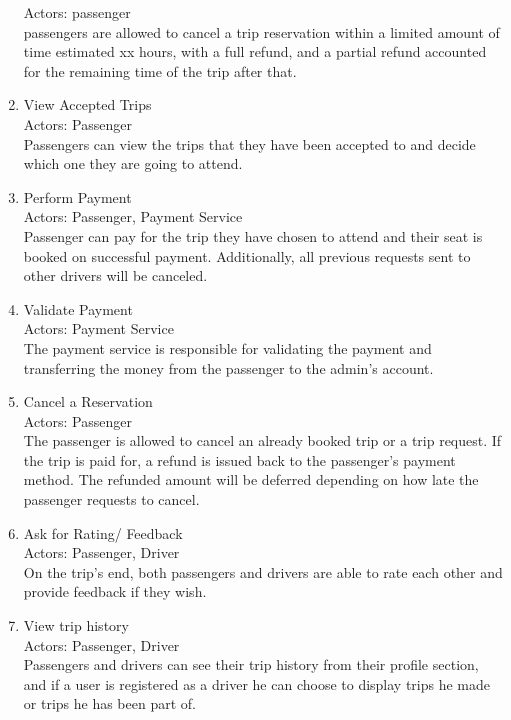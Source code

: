 \documentclass[a4paper, 12pt]{report} %
\begin{document}
\begin{enumerate}
                    Actors: passenger\\
                    passengers are allowed to cancel a trip reservation within a limited amount of time estimated xx hours, with a full refund, and a partial refund accounted for the remaining time of the trip after that.
                \item View Accepted Trips\\
                    Actors: Passenger\\
                    Passengers can view the trips that they have been accepted to and decide which one they are going to attend.
                \item Perform Payment \\
                    Actors: Passenger, Payment Service \\
                    Passenger can pay for the trip they have chosen to attend and their seat is booked on successful payment. Additionally, all previous requests sent to other drivers will be canceled.
                \item Validate Payment \\
                    Actors: Payment Service \\
                    The payment service is responsible for validating the payment and transferring the money from the passenger to the admin’s account.
                \item Cancel a Reservation\\
                    Actors: Passenger \\
                    The passenger is allowed to cancel an already booked trip or a trip request.
                    If the trip is paid for, a refund is issued back to the passenger’s payment method. The refunded amount will be deferred depending on how late the passenger requests to cancel.
                \item Ask for Rating/ Feedback\\
                    Actors: Passenger, Driver\\
                    On the trip's end, both passengers and drivers are able to rate each other and provide feedback if they wish.
                \item View trip history \\
                    Actors: Passenger, Driver \\
                    Passengers and drivers can see their trip history from their profile section, and if a user is registered as a driver he can choose to display trips he made or trips he has been part of.
            \end{enumerate}
        
\end{document}
